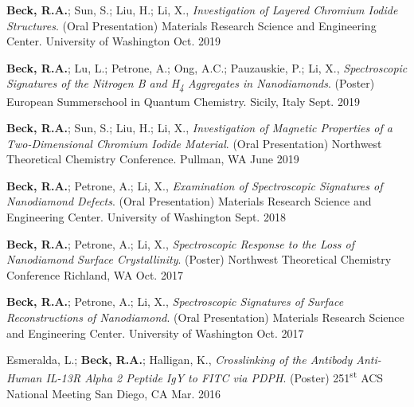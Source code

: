\begin{cvpresentations}
\cvpresentation %
{\textbf{Beck, R.A.}; Sun, S.; Liu, H.; Li, X., \textit{Investigation of Layered Chromium Iodide Structures}. (Oral Presentation) Materials Research Science and Engineering Center.}
{University of Washington} %
{Oct. 2019} %


\cvpresentation %
{\textbf{Beck, R.A.}; Lu, L.; Petrone, A.; Ong, A.C.; Pauzauskie, P.; Li, X., \textit{Spectroscopic Signatures of the Nitrogen B and H\textsubscript{4} Aggregates in Nanodiamonds}. (Poster) European Summerschool in Quantum Chemistry.}
{Sicily, Italy} %
{Sept. 2019} %


\cvpresentation %
{\textbf{Beck, R.A.}; Sun, S.; Liu, H.; Li, X., \textit{Investigation of Magnetic Properties of a Two-Dimensional Chromium Iodide Material}. (Oral Presentation) Northwest Theoretical Chemistry Conference.}
{Pullman, WA} %
{June 2019} %


\cvpresentation %
{\textbf{Beck, R.A.}; Petrone, A.; Li, X., \textit{Examination of Spectroscopic Signatures of Nanodiamond Defects}. (Oral Presentation) Materials Research Science and Engineering Center.}
{University of Washington} %
{Sept. 2018} %


\cvpresentation
{\textbf{Beck, R.A.}; Petrone, A.; Li, X., \textit{Spectroscopic Response to the Loss of Nanodiamond Surface Crystallinity}. (Poster) Northwest Theoretical Chemistry Conference}
{Richland, WA} %
{Oct. 2017} %


\cvpresentation
{\textbf{Beck, R.A.}; Petrone, A.; Li, X., \textit{Spectroscopic Signatures of Surface Reconstructions of Nanodiamond}. (Oral Presentation) Materials Research Science and Engineering Center.}
{University of Washington} %
{Oct. 2017} %




\cvpresentation
{Esmeralda, L.; \textbf{Beck, R.A.}; Halligan, K., \textit{Crosslinking of the Antibody Anti-Human IL-13R Alpha 2 Peptide IgY to FITC via PDPH}. (Poster) 251\textsuperscript{st} ACS National Meeting}
{San Diego, CA} %
{Mar. 2016} %


\end{cvpresentations}

